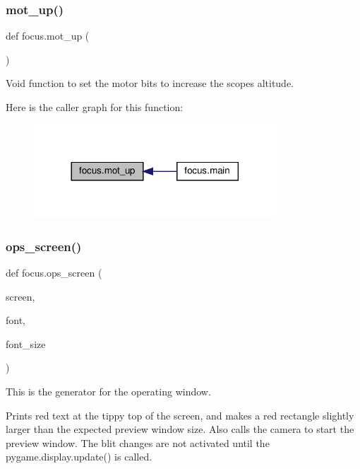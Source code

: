 \subsubsection{\texorpdfstring{mot\+\_\+up()}{mot\_up()}}
{\footnotesize\ttfamily def focus.\+mot\+\_\+up (\begin{DoxyParamCaption}{ }\end{DoxyParamCaption})}



Void function to set the motor bits to increase the scope\textquotesingle{}s altitude. 

Here is the caller graph for this function\+:\nopagebreak
\begin{figure}[H]
\begin{center}
\leavevmode
\includegraphics[width=257pt]{namespacefocus_ad0102bfe821a43392640e33721246a8c_icgraph}
\end{center}
\end{figure}
\mbox{\label{namespacefocus_a30f8dfb1f7d958ee49491a2e359ea3e2}} 
\subsubsection{\texorpdfstring{ops\+\_\+screen()}{ops\_screen()}}
{\footnotesize\ttfamily def focus.\+ops\+\_\+screen (\begin{DoxyParamCaption}\item[{}]{screen,  }\item[{}]{font,  }\item[{}]{font\+\_\+size }\end{DoxyParamCaption})}



This is the generator for the operating window. 

Prints red text at the tippy top of the screen, and makes a red rectangle slightly larger than the expected preview window size. Also calls the camera to start the preview window. The blit changes are not activated until the pygame.\+display.\+update() is called.


